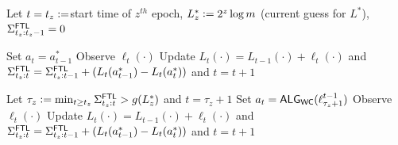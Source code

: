 


\begin{algorithm}[!ht]
\SetAlgoNoLine
\caption{$\bob$ for Small-Loss}
\label{alg:smallLossSMART}
{
    Let $t = t_z\mathrel{\mathop{:}}=$start time of $z^{th}$ epoch, $L^*_z \mathrel{\mathop{:}}= 2^z \log m$ (current guess for $L^*$), $\Sigma^{\mathsf{FTL}}_{t_z:t_z-1}=0$ \;

    {
        Set $a_t = a_{t-1}^{*}$%
        Observe $\ell_t(\cdot)$\; 
        Update $L_t(\cdot)=L_{t-1}(\cdot)+\ell_t(\cdot)$ and $\Sigma^{\mathsf{FTL}}_{t_z:t}=\Sigma^{\mathsf{FTL}}_{t_z:t-1}+(L_t(a_{t-1}^{*})-L_t(a_{t}^{*}))$ and $t = t+1$\;
    }

    Let $\tau_z := \min_{t \geq t_z} \Sigma^{\mathsf{FTL}}_{t_z:t} > g(L^*_z)$ and $t = \tau_z + 1$\;
    {
        Set $a_t = \mathsf{ALG}_{\mathsf{WC}}(\ell_{\tau_z+1}^{t-1})$ 
        Observe $\ell_t(\cdot)$\; 
        Update $L_t(\cdot)=L_{t-1}(\cdot)+\ell_t(\cdot)$ and $\Sigma^{\mathsf{FTL}}_{t_z:t}=\Sigma^{\mathsf{FTL}}_{t_z:t-1}+(L_t(a_{t-1}^{*})-L_t(a_{t}^{*}))$ and $t = t+1$\;
    }    
}
\end{algorithm}



